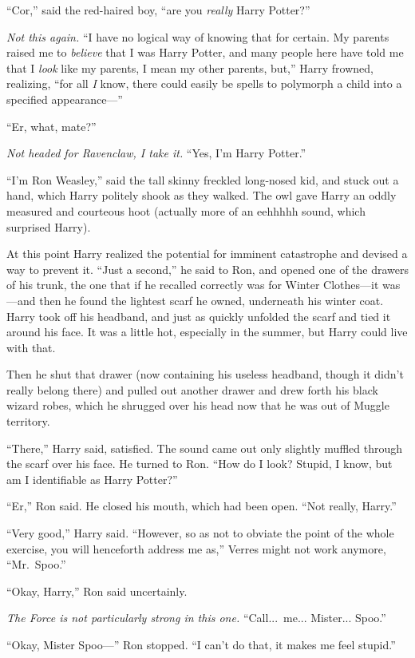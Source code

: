 “Cor,” said the red-haired boy, “are you \emph{really} Harry Potter?”

\emph{Not this again.} “I have no logical way of knowing that for certain. My parents raised me to \emph{believe} that I was Harry Potter, and many people here have told me that I \emph{look} like my parents, I mean my other parents, but,” Harry frowned, realizing, “for all \emph{I} know, there could easily be spells to polymorph a child into a specified appearance—”

“Er, what, mate?”

\emph{Not headed for Ravenclaw, I take it.} “Yes, I’m Harry Potter.”

“I’m Ron Weasley,” said the tall skinny freckled long-nosed kid, and stuck out a hand, which Harry politely shook as they walked. The owl gave Harry an oddly measured and courteous hoot (actually more of an eehhhhh sound, which surprised Harry).

At this point Harry realized the potential for imminent catastrophe and devised a way to prevent it. “Just a second,” he said to Ron, and opened one of the drawers of his trunk, the one that if he recalled correctly was for Winter Clothes—it was—and then he found the lightest scarf he owned, underneath his winter coat. Harry took off his headband, and just as quickly unfolded the scarf and tied it around his face. It was a little hot, especially in the summer, but Harry could live with that.

Then he shut that drawer (now containing his useless headband, though it didn’t really belong there) and pulled out another drawer and drew forth his black wizard robes, which he shrugged over his head now that he was out of Muggle territory.

“There,” Harry said, satisfied. The sound came out only slightly muffled through the scarf over his face. He turned to Ron. “How do I look? Stupid, I know, but am I identifiable as Harry Potter?”

“Er,” Ron said. He closed his mouth, which had been open. “Not really, Harry.”

“Very good,” Harry said. “However, so as not to obviate the point of the whole exercise, you will henceforth address me as,” Verres might not work anymore, “Mr.~Spoo.”

“Okay, Harry,” Ron said uncertainly.

\emph{The Force is not particularly strong in this one.} “Call...\ me... Mister... Spoo.”

“Okay, Mister Spoo—” Ron stopped. “I can’t do that, it makes me feel stupid.”

